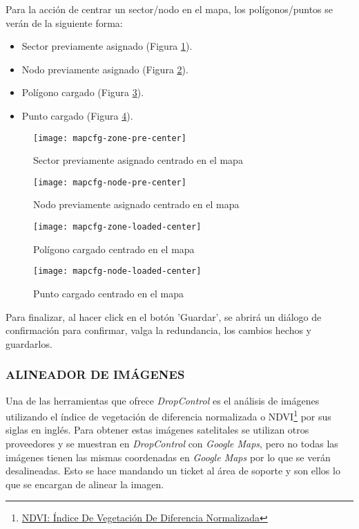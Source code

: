 Para la acción de centrar un sector/nodo en el mapa, los polígonos/puntos se verán de la siguiente forma:
\begin{itemize}
    \item Sector previamente asignado (Figura \ref{fig:mapcfg-zone-pre-center}).
    \item Nodo previamente asignado (Figura \ref{fig:mapcfg-node-pre-center}).
    \item Polígono cargado (Figura \ref{fig:mapcfg-zone-loaded-center}).
    \item Punto cargado (Figura \ref{fig:mapcfg-node-loaded-center}).
\end{itemize}

\begin{figure}[H]
	\centering
	\texttt{[image: mapcfg-zone-pre-center]}
	\caption{\label{fig:mapcfg-zone-pre-center} Sector previamente asignado centrado en el mapa}
\end{figure}

\begin{figure}[H]
	\centering
	\texttt{[image: mapcfg-node-pre-center]}
	\caption{\label{fig:mapcfg-node-pre-center} Nodo previamente asignado centrado en el mapa}
\end{figure}

\begin{figure}[H]
	\centering
	\texttt{[image: mapcfg-zone-loaded-center]}
	\caption{\label{fig:mapcfg-zone-loaded-center} Polígono cargado centrado en el mapa}
\end{figure}

\begin{figure}[H]
	\centering
	\texttt{[image: mapcfg-node-loaded-center]}
	\caption{\label{fig:mapcfg-node-loaded-center} Punto cargado centrado en el mapa}
\end{figure}

Para finalizar, al hacer click en el botón 'Guardar', se abrirá un diálogo de confirmación para confirmar, valga la redundancia, los cambios hechos y guardarlos.

\iffalse
\subsubsection{ALINEADOR DE IMÁGENES}

Una de las herramientas que ofrece \textit{DropControl} es el análisis de imágenes utilizando
el índice de vegetación de diferencia normalizada o NDVI\footnote{\href{https://eos.com/es/make-an-analysis/ndvi/}{NDVI: Índice De Vegetación De Diferencia Normalizada}} por sus siglas en inglés. Para obtener estas imágenes satelitales
se utilizan otros proveedores y se muestran en \textit{DropControl} con \textit{Google Maps}, pero no todas las imágenes tienen
las mismas coordenadas en \textit{Google Maps} por lo que se verán desalineadas. Esto se hace mandando un ticket al área de soporte
y son ellos lo que se encargan de alinear la imagen.

